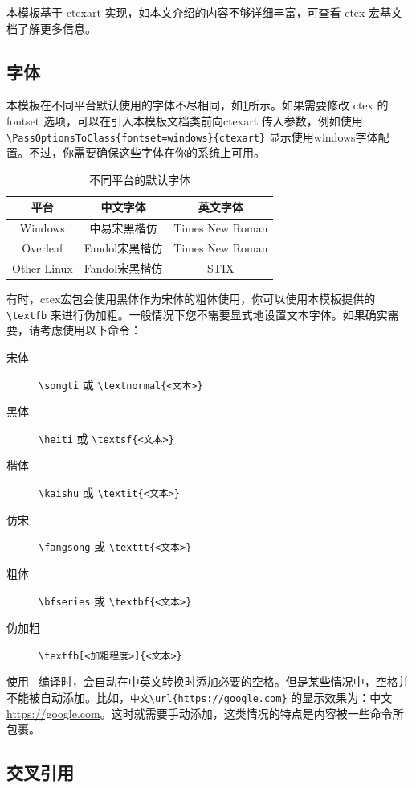 \documentclass{nktba}
\begin{document}
本模板基于 ctexart 实现，如本文介绍的内容不够详细丰富，可查看 ctex 宏基文档了解更多信息。

\subsection{字体}

本模板在不同平台默认使用的字体不尽相同，如\ref{tab:ctex-fontset}所示。如果需要修改 ctex 的 fontset 选项，可以在引入本模板文档类前向ctexart 传入参数，例如使用 \verb| \PassOptionsToClass{fontset=windows}{ctexart}| 显示使用windows字体配置。不过，你需要确保这些字体在你的系统上可用。

\begin{table}
  \centering
  \caption{不同平台的默认字体}
  \begin{tabular}{ccc}
  \toprule
  平台 & 中文字体 & 英文字体 \\
  \midrule
  Windows & 中易宋黑楷仿 & Times New Roman \\
  Overleaf & Fandol宋黑楷仿 & Times New Roman\\
  Other Linux & Fandol宋黑楷仿 & STIX \\
  \bottomrule
  \end{tabular}
  \label{tab:ctex-fontset}
\end{table}

有时，ctex宏包会使用黑体作为宋体的粗体使用，你可以使用本模板提供的\verb|\textfb| 来进行伪加粗。一般情况下您不需要显式地设置文本字体。如果确实需要，请考虑使用以下命令：

\begin{description}
\item[宋体] \verb|\songti| 或 \verb|\textnormal{<文本>}|
\item[黑体] \verb|\heiti| 或 \verb|\textsf{<文本>}|
\item[楷体] \verb|\kaishu|  或 \verb|\textit{<文本>}|
\item[仿宋] \verb|\fangsong| 或 \verb|\texttt{<文本>}|
\item[粗体] \verb|\bfseries| 或 \verb|\textbf{<文本>}|
\item[伪加粗] \verb|\textfb[<加粗程度>]{<文本>}|
\end{description}

使用 \ 编译时，会自动在中英文转换时添加必要的空格。但是某些情况中，空格并不能被自动添加。比如，\verb|中文\url{https://google.com}| 的显示效果为：中文\url{https://google.com}。这时就需要手动添加，这类情况的特点是内容被一些命令所包裹。

\subsection{交叉引用} \label{sec:ex:A}
\end{document}
